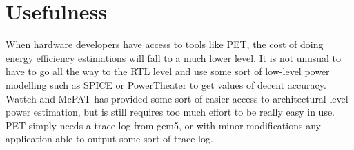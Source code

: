 \section{Usefulness}
When hardware developers have access to tools like PET, the cost of doing energy efficiency estimations will fall
to a much lower level. It is not unusual to have to go all the way to the RTL level and use some sort of
low-level power modelling such as SPICE \cite{ponomarev2002accupower} or PowerTheater \cite{bruno2005rtl} to
get values of decent accuracy. Wattch and McPAT has provided some sort of easier access to architectural level
power estimation, but is still requires too much effort to be really easy in use. PET simply needs a trace log
from gem5, or with minor modifications any application able to output some sort of trace log.

